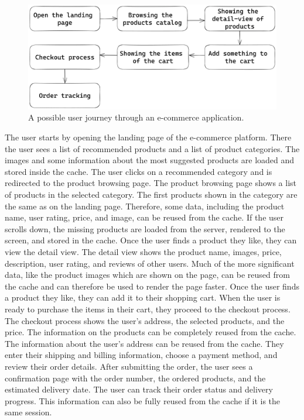 \ifshowImages
\begin{figure}[H]
  \centering
  \includegraphics[width=0.8\linewidth]{images/future-work/flow-chart-e-commerce.png}
  \caption{A possible user journey through an e-commerce application.}\label{fig:future-work:flow-chart}
\end{figure}
\fi

\noindent The user starts by opening the landing page of the e-commerce platform. There the user sees a list of recommended products and a list of product categories. The images and some information about the most suggested products are loaded and stored inside the cache. The user clicks on a recommended category and is redirected to the product browsing page. The product browsing page shows a list of products in the selected category. The first products shown in the category are the same as on the landing page. Therefore, some data, including the product name, user rating, price, and image, can be reused from the cache. If the user scrolls down, the missing products are loaded from the server, rendered to the screen, and stored in the cache. Once the user finds a product they like, they can view the detail view. The detail view shows the product name, images, price, description, user rating, and reviews of other users. Much of the more significant data, like the product images which are shown on the page, can be reused from the cache and can therefore be used to render the page faster. Once the user finds a product they like, they can add it to their shopping cart. When the user is ready to purchase the items in their cart, they proceed to the checkout process. The checkout process shows the user's address, the selected products, and the price. The information on the products can be completely reused from the cache. The information about the user's address can be reused from the cache. They enter their shipping and billing information, choose a payment method, and review their order details. After submitting the order, the user sees a confirmation page with the order number, the ordered products, and the estimated delivery date. The user can track their order status and delivery progress. This information can also be fully reused from the cache if it is the same session.

